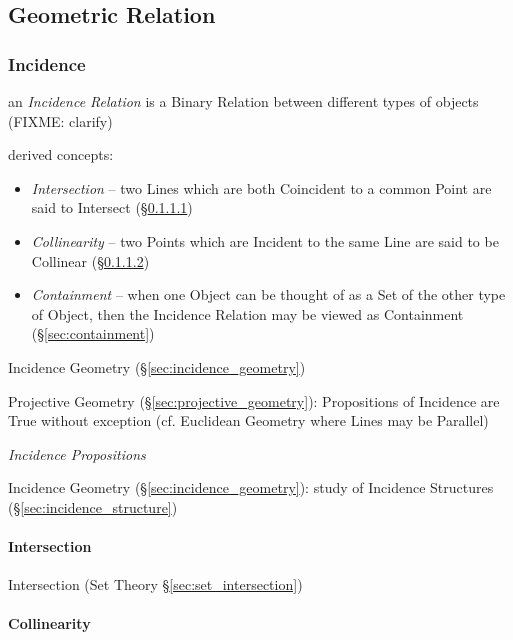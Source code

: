 \subsection{Geometric Relation}\label{sec:geometric_relation}

\subsubsection{Incidence}\label{sec:incidence}

an \emph{Incidence Relation} is a Binary Relation between different types of
objects (FIXME: clarify)

derived concepts:
\begin{itemize}
  \item \emph{Intersection} -- two Lines which are both Coincident to a common
    Point are said to Intersect (\S\ref{sec:intersection})
  \item \emph{Collinearity} -- two Points which are Incident to the same Line
    are said to be Collinear (\S\ref{sec:collinearity})
  \item \emph{Containment} -- when one Object can be thought of as a Set of the
    other type of Object, then the Incidence Relation may be viewed as
    Containment (\S\ref{sec:containment})
\end{itemize}

Incidence Geometry (\S\ref{sec:incidence_geometry})

Projective Geometry (\S\ref{sec:projective_geometry}): Propositions of Incidence
are True without exception (cf. Euclidean Geometry where Lines may be Parallel)

\emph{Incidence Propositions}

\fist Incidence Geometry (\S\ref{sec:incidence_geometry}): study of Incidence
  Structures (\S\ref{sec:incidence_structure})



\paragraph{Intersection}\label{sec:intersection}\hfill

\fist Intersection (Set Theory \S\ref{sec:set_intersection})



\paragraph{Collinearity}\label{sec:collinearity}\hfill

